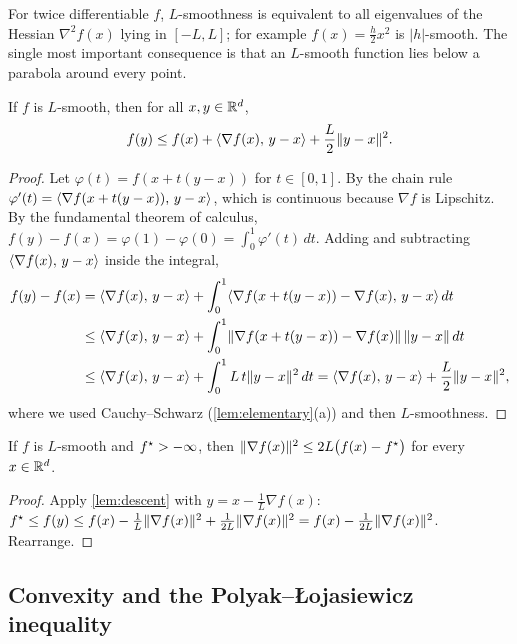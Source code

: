 For twice differentiable $f$, $L$-smoothness is equivalent to all eigenvalues of the
Hessian $\nabla^2 f(x)$ lying in $[-L,L]$; for example $f(x)=\frac h2 x^2$ is $|h|$-smooth.
The single most important consequence is that an $L$-smooth function lies below a
parabola around every point.

\begin{lemma}\label{lem:descent}
If $f$ is $L$-smooth, then for all $x,y\in\mathbb{R}^d$,
\begin{equation}\label{eq:descent}
  f(y)\le f(x)+\langle \nabla f(x),\, y-x\rangle+\frac L2\lVert y-x\rVert^2 .
\end{equation}
\end{lemma}

\begin{proof}
Let $\varphi(t)=f(x+t(y-x))$ for $t\in[0,1]$. By the chain rule
$\varphi'(t)=\langle \nabla f(x+t(y-x)),\, y-x\rangle$, which is continuous because $\nabla f$ is
Lipschitz. By the fundamental theorem of calculus,
$f(y)-f(x)=\varphi(1)-\varphi(0)=\int_0^1\varphi'(t)\,dt$. Adding and subtracting
$\langle \nabla f(x),\, y-x\rangle$ inside the integral,
\begin{align*}
f(y)-f(x)
&=\langle \nabla f(x),\, y-x\rangle+\int_0^1\langle \nabla f(x+t(y-x))-\nabla f(x),\, y-x\rangle\,dt\\
&\le\langle \nabla f(x),\, y-x\rangle+\int_0^1\lVert \nabla f(x+t(y-x))-\nabla f(x)\rVert\,\lVert y-x\rVert\,dt\\
&\le\langle \nabla f(x),\, y-x\rangle+\int_0^1 L\,t\lVert y-x\rVert^2\,dt
 =\langle \nabla f(x),\, y-x\rangle+\frac L2\lVert y-x\rVert^2,
\end{align*}
where we used Cauchy--Schwarz (\cref{lem:elementary}(a)) and then $L$-smoothness.
\end{proof}

\begin{lemma}\label{lem:grad-gap}
If $f$ is $L$-smooth and $f^\star>-\infty$, then
$\lVert \nabla f(x)\rVert^2\le 2L\bigl(f(x)-f^\star\bigr)$ for every $x\in\mathbb{R}^d$.
\end{lemma}

\begin{proof}
Apply \cref{lem:descent} with $y=x-\frac1L\nabla f(x)$:
$f^\star\le f(y)\le f(x)-\frac1L\lVert \nabla f(x)\rVert^2+\frac1{2L}\lVert \nabla f(x)\rVert^2
=f(x)-\frac1{2L}\lVert \nabla f(x)\rVert^2$. Rearrange.
\end{proof}

\subsection{Convexity and the Polyak--{\L}ojasiewicz inequality}

